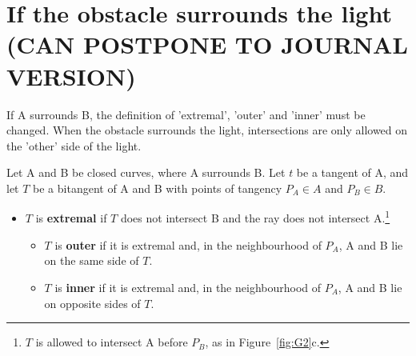 \documentclass[9pt]{article}
\begin{document}




\section{If the obstacle surrounds the light (CAN POSTPONE TO JOURNAL VERSION)}
\label{sec:surround}

If A surrounds B, the definition of 'extremal', 'outer' and 'inner' must
be changed.
When the obstacle surrounds the light, 
intersections are only allowed on the 'other' side of the light.

\begin{defn2}
Let A and B be closed curves, where A surrounds B.
Let $t$ be a tangent of A,
and let $T$ be a bitangent of A and B with points of tangency $P_A \in A$ and 
$P_B \in B$.

\begin{itemize}
\item $T$ is {\bf extremal} if $T$ does not intersect B
	and the ray  does not intersect A.\footnote{$T$ 
	is allowed to intersect A before $P_B$, as in Figure~\ref{fig:G2}c.}
\begin{itemize}
\item $T$ is {\bf outer} if it is extremal and, in the neighbourhood of $P_A$,  
A and B lie on the same side of $T$.
\item $T$ is {\bf inner} if it is extremal and, in the neighbourhood of $P_A$,
A and B lie on opposite sides of $T$.
\end{itemize}
\end{itemize}
\end{defn2}
\end{document}
